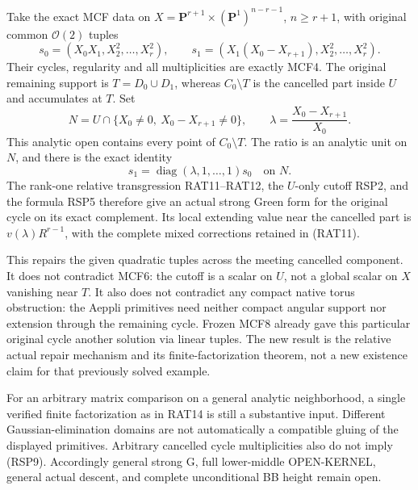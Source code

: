 Take the exact MCF data on
$X=\mathbf P^{r+1}\times(\mathbf P^1)^{n-r-1}$,
$n\ge r+1$, with original common $\mathcal O(2)$
tuples
\[
 s_0=(X_0X_1,X_2^2,\ldots,X_r^2),\qquad
 s_1=(X_1(X_0-X_{r+1}),X_2^2,\ldots,X_r^2).
 \tag{RSP11}
\]
Their cycles, regularity and all multiplicities are
exactly MCF4.  The original remaining support is
$T=D_0\cup D_1$, whereas $C_0\setminus T$ is the
cancelled part inside $U$ and accumulates at $T$.
Set
\[
 N=U\cap\{X_0\ne0,\ X_0-X_{r+1}\ne0\},\qquad
             \lambda=\frac{X_0-X_{r+1}}{X_0}.
 \tag{RSP12}
\]
This analytic open contains every point of
$C_0\setminus T$.  The ratio is an analytic unit
on $N$, and there is the exact identity
\[
                      s_1=\operatorname{diag}(\lambda,1,\ldots,1)s_0
                                                     \quad\text{on }N.
 \tag{RSP13}
\]
The rank-one relative transgression RAT11--RAT12,
the $U$-only cutoff RSP2, and the formula RSP5
therefore give an actual strong Green form for
the original cycle on its exact complement.
Its local extending value near the cancelled
part is $v(\lambda)R^{r-1}$, with the complete
mixed corrections retained in (RAT11).

This repairs the given quadratic tuples across
the meeting cancelled component.  It does not
contradict MCF6: the cutoff is a scalar on $U$,
not a global scalar on $X$ vanishing near $T$.
It also does not contradict any compact native
torus obstruction: the Aeppli primitives need
neither compact angular support nor extension
through the remaining cycle.  Frozen MCF8 already
gave this particular original cycle another
solution via linear tuples.  The new result is
the relative actual repair mechanism and its
finite-factorization theorem, not a new existence
claim for that previously solved example.

For an arbitrary matrix comparison on a general
analytic neighborhood, a single verified finite
factorization as in RAT14 is still a substantive
input.  Different Gaussian-elimination domains
are not automatically a compatible gluing of
the displayed primitives.  Arbitrary cancelled
cycle multiplicities also do not imply (RSP9).
Accordingly general strong G, full lower-middle
OPEN-KERNEL, general actual descent, and complete
unconditional BB height remain open.

